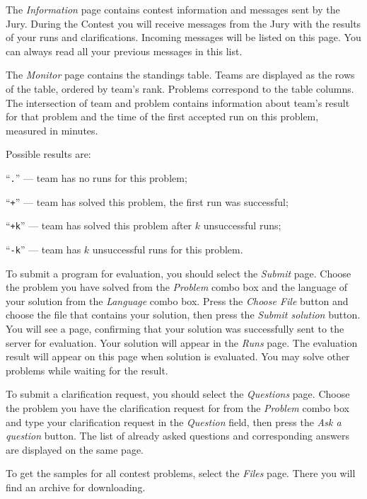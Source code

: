 
\ifdefined\online
    
\else
    
\fi

The \emph{Information} page contains contest information and messages
sent by the Jury.
During the Contest you will receive messages from the Jury with the results
of your runs and clarifications.
Incoming messages will be listed on this page.
You can always read all your previous messages in this list.

The \emph{Monitor} page contains the standings table.
Teams are displayed as the rows of the table, ordered by team's rank.
Problems correspond to the table columns.
The intersection of team and problem contains information about team's
result for that problem and the time of the first accepted run on this
problem, measured in minutes.

Possible results are:
\nopagebreak
{
\makeatletter
{}
\makeatother
\begin{shortitems}
    \itemindent=1cm
    \item[``\texttt{.}''] --- team has no runs for this problem;
    \item[``\texttt{+}''] --- team has solved this problem, the first
        run was successful;
    \item[``\texttt{+k}''] --- team has solved this problem after
        $k$ unsuccessful runs;
    \item[``\texttt{-k}''] --- team has $k$ unsuccessful runs for this
        problem.
\end{shortitems}
}

To submit a program for evaluation, you should select the \emph{Submit} page.
Choose the problem you have solved from the \emph{Problem} combo box and
the language of your solution from the \emph{Language} combo box.
Press the \emph{Choose File} button and choose the file that contains your solution,
then press the \emph{Submit solution} button.
You will see a page, confirming that your solution was successfully sent
to the server for evaluation.
Your solution will appear in the \emph{Runs} page.
The evaluation result will appear on this page when solution is evaluated.
You may solve other problems while waiting for the result.

To submit a clarification request, you should select the \emph{Questions} page.
Choose the problem you have the clarification request for from the \emph{Problem}
combo box and type your clarification request in the \emph{Question} field,
then press the \emph{Ask a question} button.
The list of already asked questions and corresponding answers are displayed
on the same page.

To get the samples for all contest problems, select the \emph{Files} page. There
you will find an archive for downloading.
